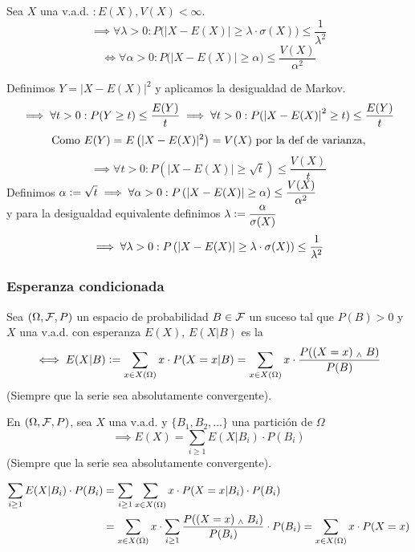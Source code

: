 \begin{teo}
	Sea $X$ una v.a.d. $: E(X), V(X)< \infty$.
	\[\implies \forall \lambda>0 : P\big(|X-E(X)|\geq \lambda\cdot \sigma(X)\big) \leq \frac{1}{\lambda^2}\]
	\[\iff \forall \alpha > 0 : \boxed{P\big(|X-E(X)|\geq \alpha\big) \leq \frac{V(X)}{\alpha^2}}\]
	\begin{dem}
		Definimos $Y=|X-E(X)|^2$ y aplicamos la desigualdad de Markov.
		\[\implies \forall t > 0 : P(Y\geq t) \leq \frac{E(Y)}{t} \implies \forall t>0: P(\left|X-E(X)\right|^2\geq t)\leq \frac{E(Y)}{t}\]
		\[\text{Como } E(Y) = E\left(|X-E(X)|^2\right) = V(X) \text{ por la def de varianza,}\]
		\[\implies \forall t>0: P\left(|X-E(X)|\geq \sqrt{t}\right)\leq \frac{V(X)}{t}\]
		Definimos $\displaystyle \alpha\vcentcolon= \sqrt{t} \implies \forall \alpha>0:
			P\left(|X-E(X)|\geq \alpha\right)\leq \frac{V(X)}{\alpha^2}$\\ y para la
		desigualdad equivalente definimos $\displaystyle \lambda \vcentcolon= \frac{\alpha}{\sigma(X)}$
		\[\implies \forall \lambda>0 : P\left(\left|X-E(X)\right|\geq \lambda\cdot \sigma(X)\right) \leq \frac{1}{\lambda^2}\]
	\end{dem}
\end{teo}
\vspace{-1.25cm}
\subsubsection{Esperanza condicionada}
\begin{defn}
	Sea $(\Omega, \mathcal{F}, P)$ un espacio de probabilidad $B\in \mathcal{F}$ un suceso tal que $P(B)>0$ y  $X$ una v.a.d. con esperanza $E(X)$, $E(X|B)$ es la 
	\[\iff E(X|B) \vcentcolon= \sum_{x\in X(\Omega)} x \cdot P(X=x | B) = \sum_{x\in X(\Omega)} x \cdot \frac{P((X=x)\; _{\wedge} \; B)}{P(B)}\]
	(Siempre que la serie sea absolutamente convergente).
\end{defn}

\begin{teo}
	En $(\Omega, \mathcal{F}, P)$, sea $X$ una v.a.d. y $\{B_1, B_2, \dots\}$ una partición de $\Omega$
	\[\implies E(X)=\sum_{i\geq 1} E(X|B_i)\cdot P(B_i)\]
	(Siempre que la serie sea absolutamente convergente).
	\begin{dem}
		\[\begin{aligned}
				\sum_{i\geq 1} E(X|B_i)\cdot P(B_i) & =\sum_{i\geq 1}\sum_{x\in X(\Omega)} x\cdot P(X=x|B_i)\cdot P(B_i)                                                           \\
				                                    & =\sum_{x\in X(\Omega)} x\cdot \sum_{i\geq 1}\frac{P((X=x)\; _{\wedge} \; B_i)}{P(B_i)}\cdot P(B_i) = \sum_{x\in X(\Omega)} x\cdot P(X=x)
			\end{aligned}\]
	\end{dem}
\end{teo}

